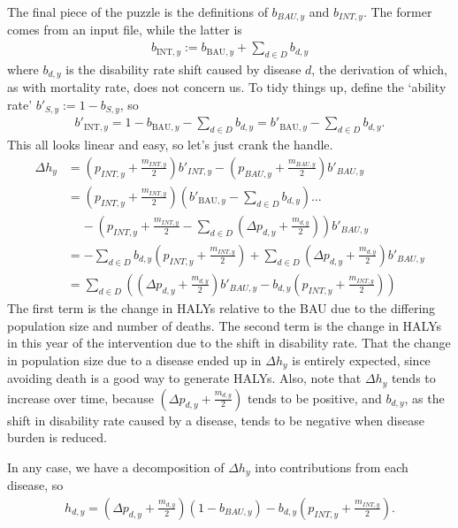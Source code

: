 \documentclass[]{article}
\begin{document}
The final piece of the puzzle is the definitions of $b_{BAU, y}$ and $b_{INT, y}$. The former comes from an input file, while the latter is
\begin{align*}
	b_{\text{INT}, y} := b_{\text{BAU}, y} + \sum_{d \in D} b_{d, y}
\end{align*}
where $b_{d, y}$ is the disability rate shift caused by disease $d$, the derivation of which, as with mortality rate, does not concern us. To tidy things up, define the `ability rate' $b'_{S, y} := 1 - b_{S, y}$, so 
\begin{align*}
	b'_{\text{INT}, y} = 1 -  b_{\text{BAU}, y} - \sum_{d \in D} b_{d, y} = b'_{\text{BAU}, y} - \sum_{d \in D} b_{d, y}.
\end{align*}
This all looks linear and easy, so let's just crank the handle.
\begin{align*}
	\Delta h_y &= \left(p_{INT, y} + \frac{m_{INT, y}}{2}\right)b'_{INT, y} - \left(p_{BAU, y} + \frac{m_{BAU, y}}{2}\right) b'_{BAU, y} \\
	&= \left(p_{INT, y} + \frac{m_{INT, y}}{2}\right) \left(b'_{\text{BAU}, y} - \sum_{d \in D} b_{d, y}\right) \ldots  \\
	&\;\;\;\; - \left(p_{INT, y} + \frac{m_{INT, y}}{2} - \sum_{d \in D} \left(\Delta p_{d, y} + \frac{m_{d, y}}{2}\right)\right)b'_{BAU, y} \\
	&= - \sum_{d \in D} b_{d, y}\left(p_{INT, y} + \frac{m_{INT, y}}{2}\right) + \sum_{d \in D} \left(\Delta p_{d, y} + \frac{m_{d, y}}{2}\right)b'_{BAU, y} \\
	&= \sum_{d \in D} \left(\left(\Delta p_{d, y} + \frac{m_{d, y}}{2}\right)b'_{BAU, y} - b_{d, y}\left(p_{INT, y} + \frac{m_{INT, y}}{2}\right)\right)
\end{align*}
The first term is the change in HALYs relative to the BAU due to the differing population size and number of deaths. The second term is the change in HALYs in this year of the intervention due to the shift in disability rate. That the change in population size due to a disease ended up in $\Delta h_y$ is entirely expected, since avoiding death is a good way to generate HALYs. Also, note that $\Delta h_y$ tends to increase over time, because $\left(\Delta p_{d, y} + \frac{m_{d, y}}{2}\right)$ tends to be positive, and $b_{d, y}$, as the shift in disability rate caused by a disease, tends to be negative when disease burden is reduced.

In any case, we have a decomposition of $\Delta h_y$ into contributions from each disease, so
\begin{align*}
	h_{d, y} = \left(\Delta p_{d, y} + \frac{m_{d, y}}{2}\right)(1 - b_{BAU, y}) - b_{d, y}\left(p_{INT, y} + \frac{m_{INT, y}}{2}\right).
\end{align*}
\end{document}
